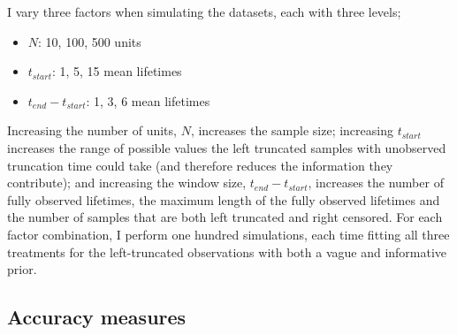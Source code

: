 I vary three factors when simulating the datasets, each with three levels;
\begin{itemize}
    \item $N$: 10, 100, 500 units
    \item $t_{start}$: 1, 5, 15 mean lifetimes
    \item $t_{end} - t_{start}$: 1, 3, 6 mean lifetimes
\end{itemize}
Increasing the number of units, $N$, increases the sample size; increasing $t_{start}$ increases the range of possible values the left truncated samples with unobserved truncation time could take (and therefore reduces the information they contribute); and increasing the window size, $t_{end} - t_{start}$, increases the number of fully observed lifetimes, the maximum length of the fully observed lifetimes and the number of samples that are both left truncated and right censored. For each factor combination, I perform one hundred simulations, each time fitting all three treatments for the left-truncated observations with both a vague and informative prior.

\subsection{Accuracy measures} \label{subsec:accuracy-measures}

